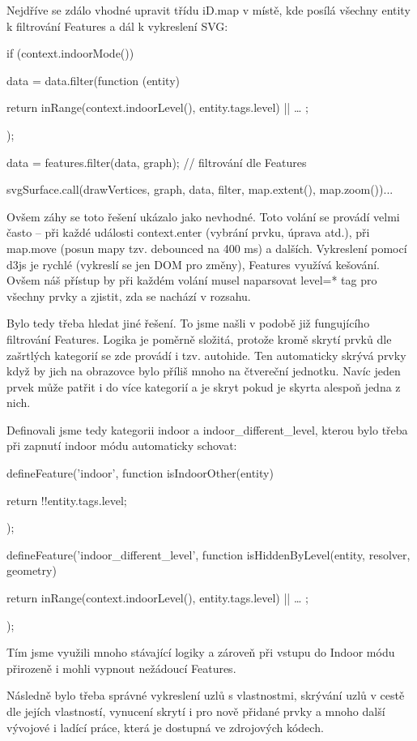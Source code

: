 Nejdříve se zdálo vhodné upravit třídu iD.map v místě, kde posílá všechny entity k filtrování Features a dál k  vykreslení SVG:

if (context.indoorMode()) {

  data = data.filter(function (entity) {

      return inRange(context.indoorLevel(), entity.tags.level) || … ;

  });

}

data = features.filter(data, graph);   // filtrování dle Features

svgSurface.call(drawVertices, graph, data, filter, map.extent(), map.zoom())...

Ovšem záhy se toto řešení ukázalo jako nevhodné. Toto volání se provádí velmi často – při každé události context.enter (vybrání prvku, úprava atd.), při map.move (posun mapy tzv. debounced na 400 ms) a dalších.  Vykreslení pomocí d3js je rychlé (vykreslí se jen DOM pro změny), Features využívá kešování. Ovšem náš přístup by při každém volání musel naparsovat level=* tag pro všechny prvky a zjistit, zda se nachází v rozsahu.

Bylo tedy třeba hledat jiné řešení. To jsme našli v podobě již fungujícího filtrování Features. Logika je poměrně složitá, protože kromě skrytí prvků dle zašrtlých kategorií se zde provádí i tzv. autohide. Ten automaticky skrývá prvky když by jich na obrazovce bylo příliš mnoho na čtvereční jednotku. Navíc jeden prvek může patřit i do více kategorií a je skryt pokud je skyrta alespoň jedna z nich.

Definovali jsme tedy kategorii indoor a indoor\_different\_level, kterou bylo třeba při zapnutí indoor módu automaticky schovat:

defineFeature('indoor', function isIndoorOther(entity) {

  return !!entity.tags.level;

});

defineFeature('indoor\_different\_level', function isHiddenByLevel(entity, resolver, geometry) {

    return inRange(context.indoorLevel(), entity.tags.level) || … ;

});

Tím jsme využili mnoho stávající logiky a zároveň při vstupu do Indoor módu přirozeně i mohli vypnout nežádoucí Features.

Následně bylo třeba správné vykreslení uzlů s vlastnostmi, skrývání uzlů v cestě dle jejích vlastností, vynucení skrytí i pro nově přidané prvky a mnoho další vývojové i ladící práce, která je dostupná ve zdrojových kódech.

